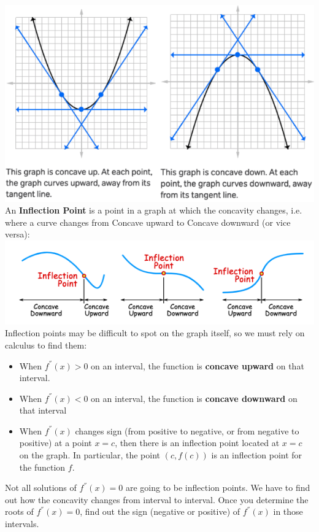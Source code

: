 \documentclass{book}
\begin{document}
	\includegraphics[scale=0.6]{concave1} \\
	
	An \textbf{Inflection Point} is a point in a graph at which the concavity changes, i.e. where a curve changes from Concave upward to Concave downward (or vice versa): \\
	
	\includegraphics[scale=0.6]{inflection1} \\
	
	Inflection points may be difficult to spot on the graph itself, so we must rely on calculus to find them:
	
	\begin{itemize}
		\item When $f^{''}(x) > 0 $ on an interval, the function is \textbf{concave upward} on that interval.
		\item When $f^{''}(x) < 0 $ on an interval,  the function is \textbf{concave downward} on that interval
		\item When $f^{''}(x)$ changes sign (from positive to negative, or from negative to positive) at a point $x = c$, then there is an inflection point located at $x = c$ on the graph. In particular, the point $(c, f(c))$ is an inflection point for the function $f$. 
	\end{itemize}
	
	\begin{mdframed}[backgroundcolor=yellow]
		Not all solutions of $f^{''}(x)=0$ are going to be inflection points. We have to find out how the concavity changes from interval to interval. Once you determine the roots of  $f^{''}(x)=0$, find out the sign (negative or positive) of  $f^{''}(x)$ in those intervals.\\
	\end{mdframed} 
	
\end{document}
